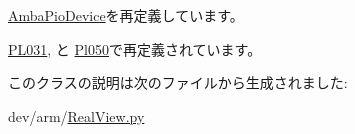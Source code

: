 \hyperlink{classRealView_1_1AmbaPioDevice_acce15679d830831b0bbe8ebc2a60b2ca}{AmbaPioDevice}を再定義しています。

\hyperlink{classRealView_1_1PL031_acce15679d830831b0bbe8ebc2a60b2ca}{PL031}, と \hyperlink{classRealView_1_1Pl050_acce15679d830831b0bbe8ebc2a60b2ca}{Pl050}で再定義されています。

このクラスの説明は次のファイルから生成されました:\begin{DoxyCompactItemize}
\item 
dev/arm/\hyperlink{RealView_8py}{RealView.py}\end{DoxyCompactItemize}

